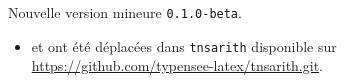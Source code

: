 Nouvelle version mineure \verb+0.1.0-beta+. 
    
\begin{itemize}[itemsep=.5em]
    \item {}  et  ont été déplacées dans \texttt{tnsarith} disponible sur \url{https://github.com/typensee-latex/tnsarith.git}.


    \separation
\end{itemize}
